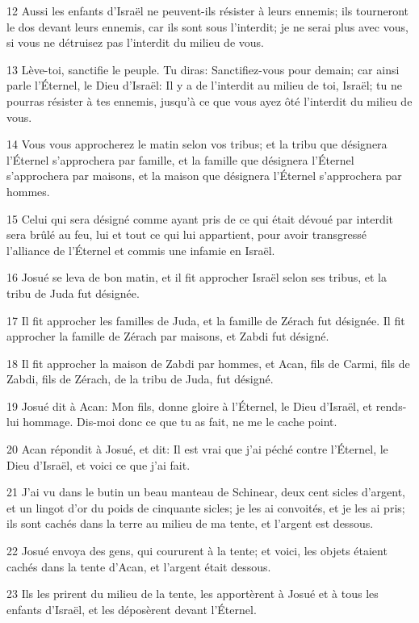 \par 12 Aussi les enfants d'Israël ne peuvent-ils résister à leurs ennemis; ils tourneront le dos devant leurs ennemis, car ils sont sous l'interdit; je ne serai plus avec vous, si vous ne détruisez pas l'interdit du milieu de vous.
\par 13 Lève-toi, sanctifie le peuple. Tu diras: Sanctifiez-vous pour demain; car ainsi parle l'Éternel, le Dieu d'Israël: Il y a de l'interdit au milieu de toi, Israël; tu ne pourras résister à tes ennemis, jusqu'à ce que vous ayez ôté l'interdit du milieu de vous.
\par 14 Vous vous approcherez le matin selon vos tribus; et la tribu que désignera l'Éternel s'approchera par famille, et la famille que désignera l'Éternel s'approchera par maisons, et la maison que désignera l'Éternel s'approchera par hommes.
\par 15 Celui qui sera désigné comme ayant pris de ce qui était dévoué par interdit sera brûlé au feu, lui et tout ce qui lui appartient, pour avoir transgressé l'alliance de l'Éternel et commis une infamie en Israël.
\par 16 Josué se leva de bon matin, et il fit approcher Israël selon ses tribus, et la tribu de Juda fut désignée.
\par 17 Il fit approcher les familles de Juda, et la famille de Zérach fut désignée. Il fit approcher la famille de Zérach par maisons, et Zabdi fut désigné.
\par 18 Il fit approcher la maison de Zabdi par hommes, et Acan, fils de Carmi, fils de Zabdi, fils de Zérach, de la tribu de Juda, fut désigné.
\par 19 Josué dit à Acan: Mon fils, donne gloire à l'Éternel, le Dieu d'Israël, et rends-lui hommage. Dis-moi donc ce que tu as fait, ne me le cache point.
\par 20 Acan répondit à Josué, et dit: Il est vrai que j'ai péché contre l'Éternel, le Dieu d'Israël, et voici ce que j'ai fait.
\par 21 J'ai vu dans le butin un beau manteau de Schinear, deux cent sicles d'argent, et un lingot d'or du poids de cinquante sicles; je les ai convoités, et je les ai pris; ils sont cachés dans la terre au milieu de ma tente, et l'argent est dessous.
\par 22 Josué envoya des gens, qui coururent à la tente; et voici, les objets étaient cachés dans la tente d'Acan, et l'argent était dessous.
\par 23 Ils les prirent du milieu de la tente, les apportèrent à Josué et à tous les enfants d'Israël, et les déposèrent devant l'Éternel.
